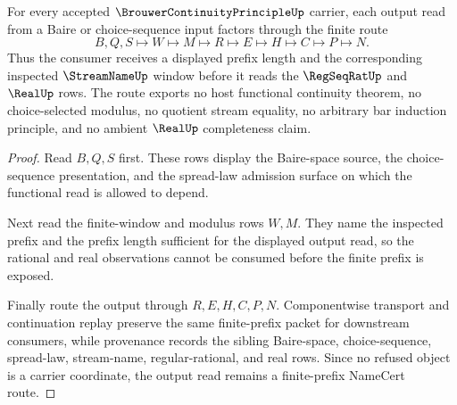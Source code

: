 \begin{theorem}
\label{thm:brouwer-continuity-principle-finite-prefix-modulus}
For every accepted $\BrouwerContinuityPrincipleUp$ carrier, each output read from a Baire or choice-sequence input factors through the finite route
$$
B,Q,S\longmapsto W\longmapsto M\longmapsto R\longmapsto E\longmapsto H\longmapsto C\longmapsto P\longmapsto N.
$$
Thus the consumer receives a displayed prefix length and the corresponding inspected $\StreamNameUp$ window before it reads the $\RegSeqRatUp$ and $\RealUp$ rows. The route exports no host functional continuity theorem, no choice-selected modulus, no quotient stream equality, no arbitrary bar induction principle, and no ambient $\RealUp$ completeness claim.
\end{theorem}
\begin{proof}
Read $B,Q,S$ first. These rows display the Baire-space source, the choice-sequence presentation, and the spread-law admission surface on which the functional read is allowed to depend.

Next read the finite-window and modulus rows $W,M$. They name the inspected prefix and the prefix length sufficient for the displayed output read, so the rational and real observations cannot be consumed before the finite prefix is exposed.

Finally route the output through $R,E,H,C,P,N$. Componentwise transport and continuation replay preserve the same finite-prefix packet for downstream consumers, while provenance records the sibling Baire-space, choice-sequence, spread-law, stream-name, regular-rational, and real rows. Since no refused object is a carrier coordinate, the output read remains a finite-prefix NameCert route.
\end{proof}


